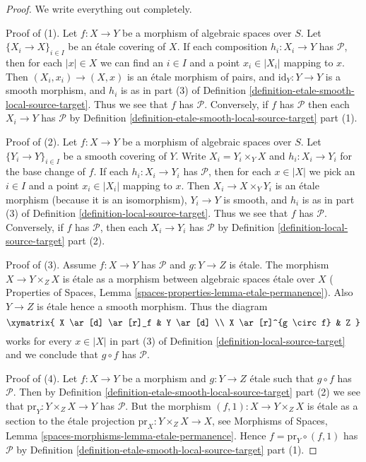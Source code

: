 \begin{proof}
We write everything out completely.

\medskip\noindent
Proof of (1). Let $f : X \to Y$ be a morphism of algebraic spaces over $S$.
Let $\{X_i \to X\}_{i \in I}$ be an \'etale covering of $X$. If each composition
$h_i : X_i \to Y$ has $\mathcal{P}$, then for each $|x| \in X$ we can find
an $i \in I$ and a point $x_i \in |X_i|$ mapping to $x$. Then
$(X_i, x_i) \to (X, x)$ is an \'etale morphism of pairs, and
$\text{id}_Y : Y \to Y$ is a smooth morphism, and $h_i$ is as in part (3) of
Definition \ref{definition-etale-smooth-local-source-target}.
Thus we see that $f$ has $\mathcal{P}$.
Conversely, if $f$ has $\mathcal{P}$ then each $X_i \to Y$ has
$\mathcal{P}$ by
Definition \ref{definition-etale-smooth-local-source-target} part (1).

\medskip\noindent
Proof of (2). Let $f : X \to Y$ be a morphism of algebraic spaces over $S$.
Let $\{Y_i \to Y\}_{i \in I}$ be a smooth covering of $Y$.
Write $X_i = Y_i \times_Y X$ and $h_i : X_i \to Y_i$ for the base change
of $f$. If each  $h_i : X_i \to Y_i$ has $\mathcal{P}$, then for each
$x \in |X|$ we pick an $i \in I$ and a point $x_i \in |X_i|$ mapping to $x$.
Then $X_i \to X \times_Y Y_i$ is an \'etale morphism
(because it is an isomorphism), $Y_i \to Y$ is
smooth, and $h_i$ is as in part (3) of
Definition \ref{definition-local-source-target}.
Thus we see that $f$ has $\mathcal{P}$.
Conversely, if $f$ has $\mathcal{P}$, then each $X_i \to Y_i$ has
$\mathcal{P}$ by
Definition \ref{definition-local-source-target} part (2).

\medskip\noindent
Proof of (3). Assume $f : X \to Y$ has $\mathcal{P}$ and $g : Y \to Z$ is
\'etale. The morphism $X \to Y \times_Z X$ is \'etale as a morphism
between algebraic spaces \'etale over $X$ (
Properties of Spaces, Lemma \ref{spaces-properties-lemma-etale-permanence}).
Also $Y \to Z$ is \'etale hence a smooth morphism.
Thus the diagram
$$
\xymatrix{
X \ar[d] \ar[r]_f & Y \ar[d] \\
X \ar[r]^{g \circ f} & Z
}
$$
works for every $x \in |X|$ in part (3) of
Definition \ref{definition-local-source-target}
and we conclude that $g \circ f$ has $\mathcal{P}$.

\medskip\noindent
Proof of (4). Let $f : X \to Y$ be a morphism and $g : Y \to Z$ \'etale
such that $g \circ f$ has $\mathcal{P}$. Then by
Definition \ref{definition-etale-smooth-local-source-target} part (2)
we see that $\text{pr}_Y : Y \times_Z X \to Y$ has $\mathcal{P}$. But
the morphism $(f, 1) : X \to Y \times_Z X$ is \'etale as a section to the
\'etale projection $\text{pr}_X : Y \times_Z X \to X$, see
Morphisms of Spaces, Lemma \ref{spaces-morphisms-lemma-etale-permanence}.
Hence $f = \text{pr}_Y \circ (f, 1)$ has $\mathcal{P}$ by
Definition \ref{definition-etale-smooth-local-source-target} part (1).
\end{proof}

